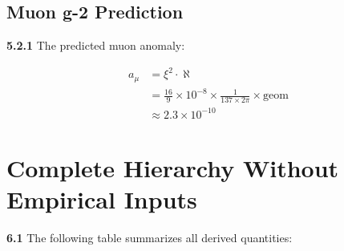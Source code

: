 \documentclass[12pt,a4paper]{article}
\newcommand{\xipar}{\xi}
\begin{document}
	\subsection{Muon g-2 Prediction}
	
	\noindent \textbf{5.2.1} The predicted muon anomaly:
	\begin{keyresult}
		\begin{align}
			a_\mu &= \xipar^2 \cdot \aleph \\
			&= \frac{16}{9} \times 10^{-8} \times \frac{1}{137 \times 2\pi} \times \text{geom} \\
			&\approx 2.3 \times 10^{-10}
		\end{align}
	\end{keyresult}
\section{Complete Hierarchy Without Empirical Inputs}

\noindent \textbf{6.1} The following table summarizes all derived quantities:
\end{document}
